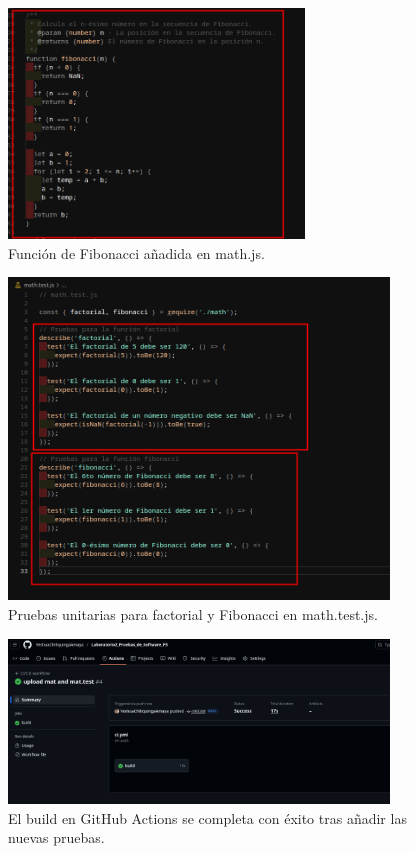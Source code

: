 \documentclass[12pt, a4paper]{article}
\begin{document}
\begin{figure}[H]
    \centering
    \includegraphics[width=0.7\textwidth]{img/nueva funcion fibonacci en mathjs.png}
    \caption{Funci\'on de Fibonacci a\~nadida en math.js.}
    \label{fig:func_fibonacci}
\end{figure}

\begin{figure}[H]
    \centering
    \includegraphics[width=0.9\textwidth]{img/respectivas pruebas para fibonacci y para factaorial en el math testjs.png}
    \caption{Pruebas unitarias para factorial y Fibonacci en math.test.js.}
    \label{fig:pruebas_math}
\end{figure}

\begin{figure}[H]
    \centering
    \includegraphics[width=0.9\textwidth]{img/salo todo bien en mattestjs sallio con visto verde y build.png}
    \caption{El build en GitHub Actions se completa con \'exito tras a\~nadir las nuevas pruebas.}
    \label{fig:build_verde}
\end{figure}
\end{document}
